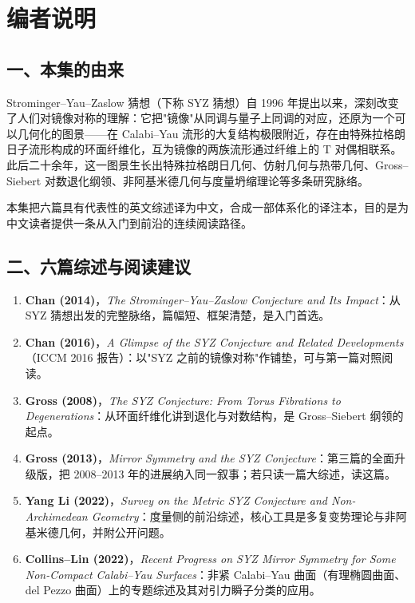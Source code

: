 \chapter*{编者说明}

\section*{一、本集的由来}

Strominger--Yau--Zaslow 猜想（下称 SYZ 猜想）自 1996 年提出以来，深刻改变了人们对镜像对称的理解：它把"镜像"从同调与量子上同调的对应，还原为一个可以几何化的图景------在 Calabi--Yau 流形的大复结构极限附近，存在由特殊拉格朗日子流形构成的环面纤维化，互为镜像的两族流形通过纤维上的 T 对偶相联系。此后二十余年，这一图景生长出特殊拉格朗日几何、仿射几何与热带几何、Gross--Siebert 对数退化纲领、非阿基米德几何与度量坍缩理论等多条研究脉络。

本集把六篇具有代表性的英文综述译为中文，合成一部体系化的译注本，目的是为中文读者提供一条从入门到前沿的连续阅读路径。

\section*{二、六篇综述与阅读建议}

\begin{enumerate}
  \item \textbf{Chan (2014)}，\emph{The Strominger--Yau--Zaslow Conjecture and Its Impact}：从 SYZ 猜想出发的完整脉络，篇幅短、框架清楚，是入门首选。
  \item \textbf{Chan (2016)}，\emph{A Glimpse of the SYZ Conjecture and Related Developments}（ICCM 2016 报告）：以"SYZ 之前的镜像对称"作铺垫，可与第一篇对照阅读。
  \item \textbf{Gross (2008)}，\emph{The SYZ Conjecture: From Torus Fibrations to Degenerations}：从环面纤维化讲到退化与对数结构，是 Gross--Siebert 纲领的起点。
  \item \textbf{Gross (2013)}，\emph{Mirror Symmetry and the SYZ Conjecture}：第三篇的全面升级版，把 2008--2013 年的进展纳入同一叙事；若只读一篇大综述，读这篇。
  \item \textbf{Yang Li (2022)}，\emph{Survey on the Metric SYZ Conjecture and Non-Archimedean Geometry}：度量侧的前沿综述，核心工具是多复变势理论与非阿基米德几何，并附公开问题。
  \item \textbf{Collins--Lin (2022)}，\emph{Recent Progress on SYZ Mirror Symmetry for Some Non-Compact Calabi--Yau Surfaces}：非紧 Calabi--Yau 曲面（有理椭圆曲面、del Pezzo 曲面）上的专题综述及其对引力瞬子分类的应用。
\end{enumerate}

